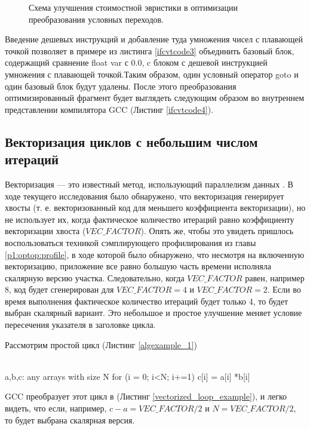 \begin{figure}[htbp]
	\centering
	
	\caption{Схема улучшения стоимостной эвристики в оптимизации преобразования условных переходов.}
	\label{ifcvt2svg1}
\end{figure}

Введение дешевых инструкций и добавление туда умножения чисел с плавающей точкой позволяет в примере из листинга \ref{ifcvtcode3} объединить  базовый блок, содержащий сравнение float var с 0.0, c блоком с дешевой инструкцией умножения с плавающей точкой.Таким образом, один условный оператор goto и один базовый блок будут удалены. После этого преобразования оптимизированный фрагмент будет выглядеть следующим образом во внутреннем представлении компилятора GCC (Листинг \ref{ifcvtcode4}).

\subsection {Векторизация циклов с небольшим числом итераций}
Векторизация — это известный метод, использующий параллелизм данных \cite{nuzman2006autovectorization}. В ходе текущего исследования было обнаружено, что векторизация генерирует хвосты (т. е. векторизованный код для меньшего коэффициента векторизации), но не использует их, когда фактическое количество итераций равно коэффициенту векторизации хвоста ($VEC\_FACTOR$). Опять же, чтобы это увидеть пришлось воспользоваться техникой сэмплирующего профилирования из главы \ref{p1:optop:profile}, в ходе которой было обнаружено, что несмотря на включенную векторизацию, приложение все равно большую часть времени исполняла скалярную версию участка. Следовательно, когда $VEC\_FACTOR$ равен, например 8, код будет сгенерирован для $VEC\_FACTOR = 4$ и $VEC\_FACTOR = 2$. Если во время выполнения фактическое количество итераций будет только 4, то будет выбран скалярный вариант. Это небольшое и простое улучшение меняет условие пересечения указателя в заголовке цикла.

Рассмотрим простой цикл (Листинг \ref{algexample_1})

\begin{ListingEnv}[!h]
	\captiondelim{ } %
	\caption{Простой цикл рассматриваемый оптимизацией векторизации.}\label{algexample_1}
	\begin{Verb}
		\\ a,b,c: any arrays with size N
		for (i = 0; i<N; i+=1)
		    c[i] = a[i] *b[i]
	\end{Verb}
\end{ListingEnv}
GCC преобразует этот цикл в (Листинг \ref{vectorized_loop_example}), и легко видеть, что если, например, $c-a = VEC\_FACTOR/2$ и $N = VEC\_FACTOR/2$, то будет выбрана скалярная версия.

